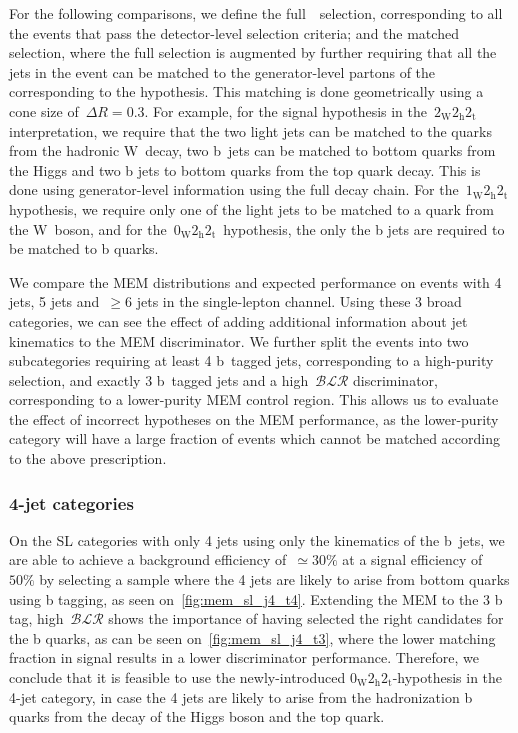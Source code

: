 For the following comparisons, we define the full~\ttHbb~selection, corresponding to all the events that pass the detector-level selection criteria; and the matched selection, where the full selection is augmented by further requiring that all the jets in the event can be matched to the generator-level partons of the corresponding to the hypothesis. This matching is done geometrically using a cone size of~$\Delta R = 0.3$. For example, for the signal hypothesis in the~$2_{\mathrm{W}} 2_{\mathrm{h}} 2_{\mathrm{t}}$ interpretation, we require that the two light jets can be matched to the quarks from the hadronic W~decay, two b~jets can be matched to bottom quarks from the Higgs and two b jets to bottom quarks from the top quark decay. This is done using generator-level information using the full decay chain. For the~$1_{\mathrm{W}} 2_{\mathrm{h}} 2_{\mathrm{t}}$ hypothesis, we require only one of the light jets to be matched to a quark from the W~boson, and for the~$0_{\mathrm{W}} 2_{\mathrm{h}} 2_{\mathrm{t}}$~hypothesis, the only the b jets are  required to be matched to b quarks.

We compare the MEM distributions and expected performance on events with 4 jets, 5 jets and~$\ge6$ jets in the single-lepton channel. Using these 3 broad categories, we can see the effect of adding additional information about jet kinematics to the MEM discriminator. We further split the events into two subcategories requiring at least 4 b~tagged jets, corresponding to a high-purity selection, and exactly 3 b~tagged jets and a high~$\mathcal{BLR}$ discriminator, corresponding to a lower-purity MEM control region. This allows us to evaluate the effect of incorrect hypotheses on the MEM performance, as the lower-purity category will have a large fraction of events which cannot be matched according to the above prescription. 

\subsubsection{4-jet categories}
On the SL categories with only 4 jets using only the kinematics of the b~jets, we are able to achieve a background efficiency of~$\simeq 30\%$ at a signal efficiency of~$50\%$ by selecting a sample where the 4 jets are likely to arise from bottom quarks using b tagging, as seen on~\cref{fig:mem_sl_j4_t4}. Extending the MEM to the 3 b tag, high~$\mathcal{BLR}$ shows the importance of having selected the right candidates for the b quarks, as can be seen on~\cref{fig:mem_sl_j4_t3}, where the lower matching fraction in signal results in a lower discriminator performance. Therefore, we conclude that it is feasible to use the newly-introduced $0_{\mathrm{W}} 2_{\mathrm{h}} 2_{\mathrm{t}}$-hypothesis in the 4-jet category, in case the 4 jets are likely to arise from the hadronization b quarks from the decay of the Higgs boson and the top quark.

